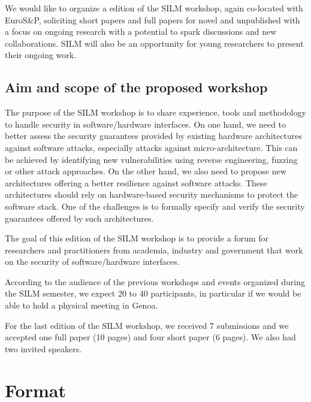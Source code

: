 \documentclass[a4paper,11pt]{article} %
\numberwithin{equation}{section} %
\numberwithin{figure}{section} %
\numberwithin{table}{section} %
\newcommand{\SILMNum}{\nth{5}}
\begin{document}
We would like to organize a \SILMNum{} edition of the SILM workshop, again
co-located with EuroS\&P, soliciting short papers and full papers for novel and unpublished with a focus on ongoing research with a potential to spark discussions and new collaborations. SILM will also be an
opportunity for young researchers to present their ongoing work.

\subsection{Aim and scope of the proposed workshop}


The purpose of the SILM workshop is to share experience, tools and
methodology to handle security in software/hardware interfaces. On one
hand, we need to better assess the security guarantees provided by existing
hardware architectures against software attacks, especially attacks against
micro-architecture. This can be achieved by identifying new vulnerabilities
using reverse engineering, fuzzing or other attack approaches. On the other
hand, we also need to propose new architectures offering a better
resilience against software attacks. These architectures should rely on
hardware-based security mechanisms to protect the software stack. One of
the challenges is to formally specify and verify the security guarantees
offered by such architectures.

The goal of this \SILMNum{} edition of the SILM workshop is to provide a forum
for  researchers and practitioners from academia, industry and government
that work on the security of software/hardware interfaces.

According to the audience of the previous workshops and events organized
during the SILM semester, we expect 20 to 40 participants, in particular if
we would be able to hold a physical meeting in Genoa.

For the last edition of the SILM workshop, we received 7 submissions and we
accepted one full paper (10 pages) and four short paper (6 pages). We also
had two invited speakers.

% 

\section{Format}
\end{document}
